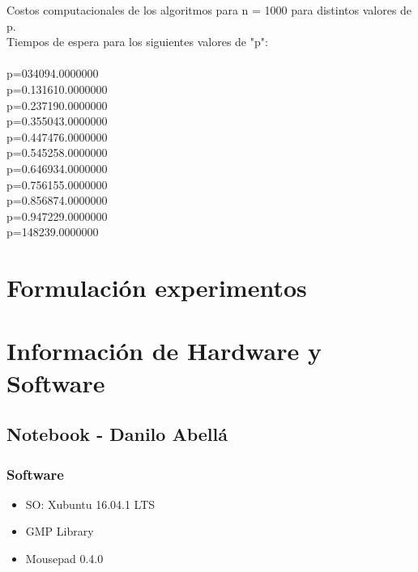 \documentclass[12pt,letterpaper]{scrartcl}
\begin{document}
Costos computacionales de los algoritmos para n = 1000 para distintos valores de p.
\\
Tiempos de espera para los siguientes valores de "p":
\\\\
	p=0\hspace{1cm}34094.0000000
\\
	p=0.1\hspace{1cm}31610.0000000
\\
	p=0.2\hspace{1cm}37190.0000000
\\
	p=0.3\hspace{1cm}55043.0000000
\\
	p=0.4\hspace{1cm}47476.0000000
\\
	p=0.5\hspace{1cm}45258.0000000
\\
	p=0.6\hspace{1cm}46934.0000000
\\
	p=0.7\hspace{1cm}56155.0000000
\\
	p=0.8\hspace{1cm}56874.0000000
\\
	p=0.9\hspace{1cm}47229.0000000
\\
	p=1\hspace{1cm}48239.0000000


\newpage
\section{Formulación experimentos}

\section{Información de Hardware y Software}


\subsection{ Notebook - Danilo Abellá}
\subsubsection{Software}
\begin{itemize}
\item SO: Xubuntu 16.04.1 LTS
\item GMP Library
\item Mousepad 0.4.0
\end{itemize}
\end{document}
